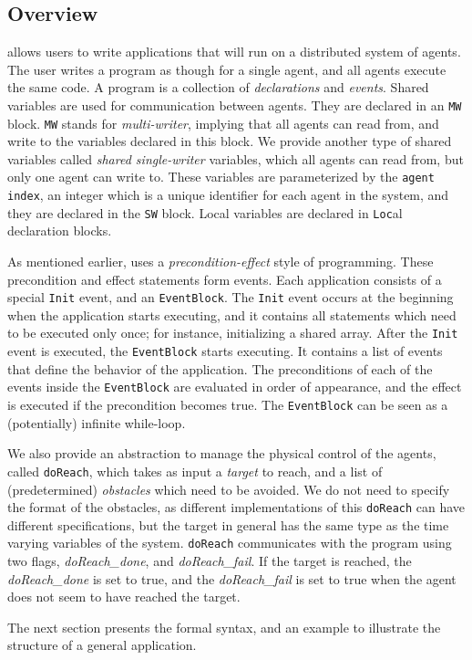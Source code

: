 \subsection{Overview}
\label{sect:Overview}
\rolang allows users to write applications that will run on a distributed system of agents. The user writes a program as though for a single agent, and all agents execute the same code. A \rolang program is a collection of \emph{declarations} and \emph{events}. Shared variables are used for communication between agents. They are declared in an \verb|MW| block. \verb|MW| stands for \emph{multi-writer}, implying that all agents can read from, and write to the variables declared in this block. We provide another type of shared variables called \emph{shared single-writer} variables, which all agents can read from, but only one agent can write to. These variables are parameterized by the \verb|agent index|, an integer which is a unique identifier for each agent in the system, and they are declared in the \verb|SW| block. Local variables are declared in \verb|Loc|al declaration blocks.  \newline

As mentioned earlier, \rolang uses a \emph{precondition-effect} style of programming. These precondition and effect statements form events. Each application consists of a special \verb|Init| event, and an \verb|EventBlock|. The \verb|Init| event occurs at the beginning when the application starts executing, and it contains all statements which need to be executed only once; for instance, initializing a shared array. After the \verb|Init| event is executed, the \verb|EventBlock| starts executing. It contains a list of events that define the behavior of the application. The preconditions of each of the events inside the \verb|EventBlock| are evaluated in order of appearance, and the effect is executed if the precondition becomes true. The \verb|EventBlock| can be seen as a (potentially) infinite while-loop. 

We also provide an abstraction to manage the physical control of the agents, called \verb|doReach|, which takes as input a \emph{target} to reach, and a list of (predetermined) \emph{obstacles} which need to be avoided. We do not need to specify the format of the obstacles, as different implementations of this \verb|doReach| can have different specifications, but the target in general has the same type as the time varying variables of the system. \verb|doReach| communicates with the program using two flags, \emph{doReach_done}, and \emph{doReach_fail}. If the target is reached, the \emph{doReach_done} is set to true, and the \emph{doReach_fail} is set to true when the agent does not seem to have reached the target.

The next section presents the formal syntax, and an example to illustrate the structure of a general application. 

